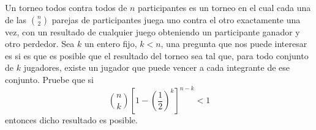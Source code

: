 \begin{statement}{23}
  Un torneo todos contra todos de $n$ participantes es un torneo en el cual
  cada una de las $\binom{n}{2}$ parejas de participantes juega uno contra el otro
  exactamente una vez, con un resultado de cualquier juego obteniendo un
  participante ganador y otro perdedor.
  Sea $k$ un entero fijo, $k < n$, una pregunta que nos puede interesar es si
  es que es posible que el resultado del torneo sea tal que, para todo conjunto
  de $k$ jugadores, existe un jugador que puede vencer a cada integrante de ese
  conjunto. Pruebe que si
  \[
    \binom{n}{k}\left[1 - \left(\frac{1}{2}\right)^k\right]^{n - k} < 1
  \]
  entonces dicho resultado es posible.
\end{statement}